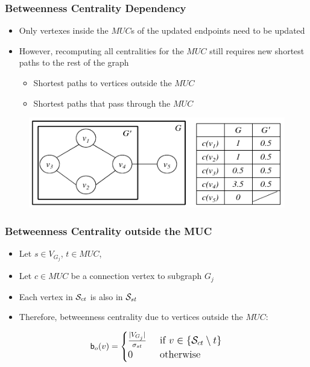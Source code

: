 \begin{frame}
  \frametitle{Betweenness Centrality Dependency}
  
  \begin{itemize}
    \item Only vertexes inside the $MUC$s of the updated endpoints need to be updated
    \item However, recomputing all centralities for the $MUC$ still requires new shortest paths to the rest of the graph
      \begin{itemize}
        \item Shortest paths to vertices outside the $MUC$
        \item Shortest paths that pass through the $MUC$
      \end{itemize}
  \end{itemize}
  
  \begin{figure}[t]
    \centering
    \includegraphics[width=\textwidth, height=0.6\textheight, keepaspectratio]{imgs/qube-btwmuc}
  \end{figure}
\end{frame}


\begin{frame}
  \frametitle{Betweenness Centrality outside the MUC}
  
  \begin{itemize}
    \item Let $s \in V_{G_j}$, $t \in MUC$,
    \item Let $c \in MUC$ be a connection vertex to subgraph $G_j$
    \item Each vertex in $\mathcal{S}_{ct}$ is also in $\mathcal{S}_{st}$
    \item Therefore, betweenness centrality due to vertices outside the $MUC$:    
  \end{itemize}
  
  \begin{align*}
    \large
    \mathsf{b}_{o}(v) = \begin{cases}
      \frac{|V_{G_j}|}{\sigma_{st}}		& \text{ if } v \in\{ \mathcal{S}_{ct} \setminus t \} \\
      0 						& \text{ otherwise }
    \end{cases}
  \end{align*}
\end{frame}


